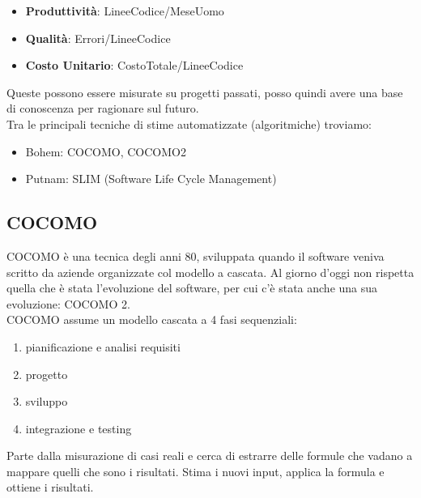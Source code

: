 \begin{itemize}
    \item \textbf{Produttività}: LineeCodice/MeseUomo
    \item \textbf{Qualità}: Errori/LineeCodice
    \item \textbf{Costo Unitario}: CostoTotale/LineeCodice
\end{itemize}
Queste possono essere misurate su progetti passati, posso quindi avere una base di conoscenza per ragionare sul futuro.\\
Tra le principali tecniche di stime automatizzate (algoritmiche) troviamo:
\begin{itemize}
    \item Bohem: COCOMO, COCOMO2
    \item Putnam: SLIM (Software Life Cycle Management)
\end{itemize}

\subsection{COCOMO}
COCOMO è una tecnica degli anni 80, sviluppata quando il software veniva scritto da aziende organizzate col modello a cascata. Al giorno d'oggi non rispetta quella che è stata l'evoluzione del software, per cui c'è stata anche una sua evoluzione: COCOMO 2. \\
COCOMO assume un modello cascata a 4 fasi sequenziali: 
\begin{enumerate}
    \item pianificazione e analisi requisiti
    \item progetto
    \item sviluppo
    \item integrazione e testing
\end{enumerate}
 Parte dalla misurazione di casi reali e cerca di estrarre delle formule che vadano a mappare quelli che sono i risultati. Stima i nuovi input, applica la formula e ottiene i risultati. \\

